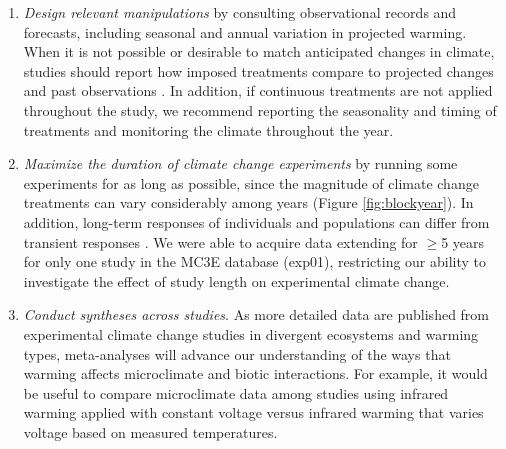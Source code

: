 \documentclass{article}
\begin{document}
\begin{enumerate}
\item\textit{Design relevant manipulations} by consulting observational records and forecasts, including seasonal and annual variation in projected warming. When it is not possible or desirable to match anticipated changes in climate, studies should report how imposed treatments compare to projected changes and past observations \citep[e.g.,][]{hoover2014, zhu2016}. In addition, if continuous treatments are not applied throughout the study, we recommend reporting the seasonality and timing of treatments and monitoring the climate throughout the year.

\item\textit{Maximize the duration of climate change experiments} by running some experiments for as long as possible, since the magnitude of climate change treatments can vary considerably among years (Figure \ref{fig:blockyear}). In addition, long-term responses of individuals and populations can differ from transient responses \citep{saleska2002,franklin1989,giasson2013,harte2015}. We were able to acquire data extending for $\geq$5 years for only one study in the MC3E database (exp01), restricting our ability to investigate the effect of study length on experimental climate change. %
\item\textit{Conduct syntheses across studies}. As more detailed data are published from experimental climate change studies in divergent ecosystems and warming types, meta-analyses will advance our understanding of the ways that warming affects microclimate and biotic interactions. For example, it would be useful to compare microclimate data among studies using infrared warming applied with constant voltage versus infrared warming that varies voltage based on measured temperatures. 

\end{enumerate}


\clearpage
\end{document}
